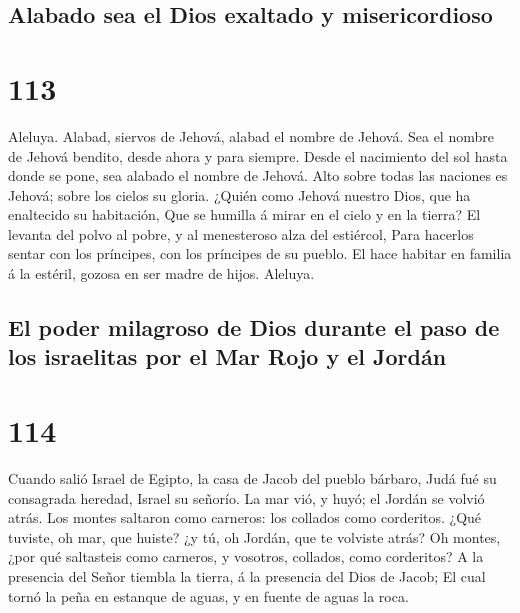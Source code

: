 \hypertarget{alabado-sea-el-dios-exaltado-y-misericordioso}{%
\subsection{Alabado sea el Dios exaltado y
misericordioso}\label{alabado-sea-el-dios-exaltado-y-misericordioso}}

\hypertarget{section-112}{%
\section{113}\label{section-112}}

 Aleluya. Alabad, siervos de Jehová, alabad el nombre de
Jehová.  Sea el nombre de Jehová bendito, desde ahora y
para siempre.  Desde el nacimiento del sol hasta donde se
pone, sea alabado el nombre de Jehová.  Alto sobre todas
las naciones es Jehová; sobre los cielos su gloria. 
¿Quién como Jehová nuestro Dios, que ha enaltecido su habitación,
 Que se humilla á mirar en el cielo y en la tierra?
 El levanta del polvo al pobre, y al menesteroso alza del
estiércol,  Para hacerlos sentar con los príncipes, con
los príncipes de su pueblo.  El hace habitar en familia á
la estéril, gozosa en ser madre de hijos. Aleluya.

\hypertarget{el-poder-milagroso-de-dios-durante-el-paso-de-los-israelitas-por-el-mar-rojo-y-el-jorduxe1n}{%
\subsection{El poder milagroso de Dios durante el paso de los israelitas
por el Mar Rojo y el
Jordán}\label{el-poder-milagroso-de-dios-durante-el-paso-de-los-israelitas-por-el-mar-rojo-y-el-jorduxe1n}}

\hypertarget{section-113}{%
\section{114}\label{section-113}}

 Cuando salió Israel de Egipto, la casa de Jacob del
pueblo bárbaro,  Judá fué su consagrada heredad, Israel su
señorío.  La mar vió, y huyó; el Jordán se volvió atrás.
 Los montes saltaron como carneros: los collados como
corderitos.  ¿Qué tuviste, oh mar, que huiste? ¿y tú, oh
Jordán, que te volviste atrás?  Oh montes, ¿por qué
saltasteis como carneros, y vosotros, collados, como corderitos?
 A la presencia del Señor tiembla la tierra, á la
presencia del Dios de Jacob;  El cual tornó la peña en
estanque de aguas, y en fuente de aguas la roca.

